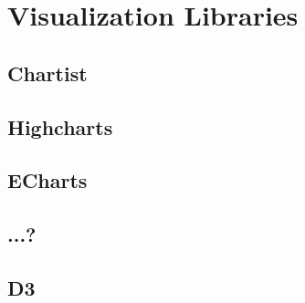 \section{Visualization Libraries}

\subsection{Chartist}
\subsection{Highcharts}
\subsection{ECharts}
\subsection{...?}
\subsection{D3}


